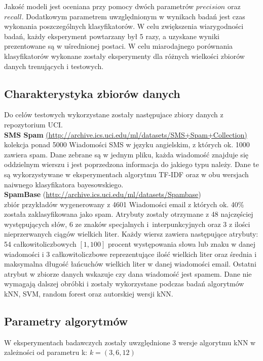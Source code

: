 \documentclass[a4paper, 10pt]{article}
\begin{document}
Jakość modeli jest oceniana przy pomocy dwóch parametrów $precision$ oraz $recall$. Dodatkowym 
parametrem uwzględnionym w wynikach badań jest czas wykonania poszczególnych klasyfikatorów. 
W celu zwiększenia wiarygodności badań, każdy eksperyment powtarzany był 5 razy, a uzyskane wyniki prezentowane 
są w uśrednionej postaci. W celu miarodajnego porównania klasyfikatorów wykonane zostały eksperymenty dla różnych wielkości 
zbiorów danych trenujących i testowych.






	\subsection{Charakterystyka zbiorów danych}
	
Do celów testowych wykorzystane zostały następujace zbiory danych z repozytorium UCI.\\

\textbf{SMS Spam} \url{(http://archive.ics.uci.edu/ml/datasets/SMS+Spam+Collection)} \\ kolekcja ponad 5000 Wiadomości SMS w języku angielskim, z których ok. 1000 zawiera spam. Dane zebrane są w jednym pliku, każda wiadomość znajduje się oddzielnym wierszu i 
jest poprzedzona informacja do jakiego typu należy. Dane te są wykorzystywane w eksperymentach algorytmu TF-IDF oraz w obu wersjach naiwnego klasyfikatora bayesowskiego. \\

\textbf{SpamBase} (\url{http://archive.ics.uci.edu/ml/datasets/Spambase}) \\ zbiór przykładów wygenerowany z 4601 Wiadomości email z których ok. 40\% została zaklasyfikowana jako spam. Atrybuty zostały otrzymane z 48 najczęściej występujących słów, 
6 ze znaków specjalnych i~interpunkcyjnych oraz 3 z ilości nieprzerwanych ciągów wielkich liter.  Każdy wiersz zawiera następujące atrybuty: 54 całkowitoliczbowych $[1,100]$ procent występowania słowa lub znaku w danej wiadomości 
i 3 całkowitoliczbowe reprezentujące ilość wielkich liter oraz średnia i maksymalna długość łańcuchów wielkich liter w danej wiadomości email. Ostatni atrybut w zbiorze danych wskazuje czy dana wiadomość jest spamem. 
Dane nie wymagają dalszej obróbki i zostały wykorzystane podczas badań 	algorytmów kNN, SVM, random forest oraz autorskiej wersji kNN.
	
	
	\subsection{Parametry algorytmów}
W eksperymentach badawczych zostały uwzględnione 3 wersje algorytmu kNN w zależności od parametru k: $k=(3,6,12)$
\end{document}
